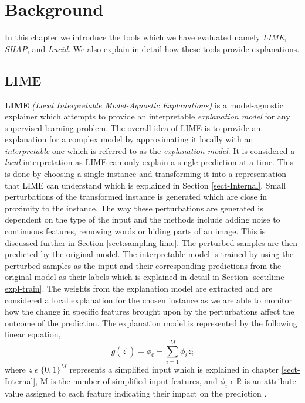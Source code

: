 
\chapter{Background} \label{sect-background}
In this chapter we introduce the tools which we have evaluated namely \emph{LIME}, \emph{SHAP}, and \emph{Lucid}. We also explain in detail how these tools provide explanations.
\section{LIME}
\textbf{LIME} \emph{(Local Interpretable Model-Agnostic Explanations)} \cite{lime} is a model-agnostic explainer which attempts to provide an interpretable \emph{explanation model} for any supervised learning problem. The overall idea of LIME is to provide an explanation for a complex model by approximating it locally with an \emph{interpretable} one which is referred to as the \emph{explanation model}. It is considered a \emph{local} interpretation as LIME can only explain a single prediction at a time. This is done by choosing a single instance and transforming it into a representation that LIME can understand which is explained in Section \ref{sect-Internal}. Small perturbations of the transformed instance is generated which are close in proximity to the instance. The way these perturbations are generated is dependent on the type of the input and the methods include adding noise to continuous features, removing words or hiding parts of an image.  This is discussed further in Section \ref{sect:sampling-lime}. The perturbed samples are then predicted by the original model. The interpretable model is trained by using the perturbed samples as the input and their corresponding predictions from the original model as their labels which is explained in detail in Section \ref{sect:lime-expl-train}. The weights from the explanation model are extracted and are considered a local explanation for the chosen instance as we are able to monitor how the change in specific features brought upon by the perturbations affect the outcome of the prediction. The explanation model is represented by the following linear equation,
\begin{equation}
g(z^{'}) = \phi_0 + \sum\limits_{i=1}^M \phi_i z_{i}^{'}
\label{eq:lime-explanation}
\end{equation}
where $z^{'} \epsilon$ $\{0,1\}^{M}$ represents a simplified input which is explained in chapter \ref{sect-Internal}, M is the number of simplified input features, and $\phi_{i}$ $\epsilon$ $\mathbb{R}$ is an attribute value assigned to each feature indicating their impact on the prediction \cite{NIPS2017_7062}.
